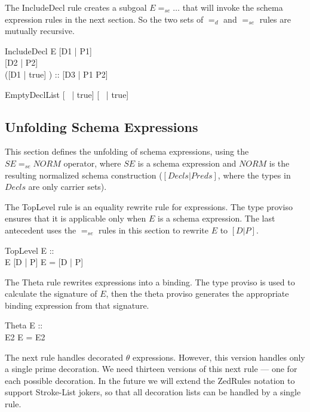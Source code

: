 \documentclass{entcs}
\newcommand{\sexprUnfoldsTo}{\mathrel{=_{se}}}
\newcommand{\declListUnfoldsTo}{\mathrel{=_d}}
\newcommand{\is}{\mathrel{is}}
\begin{document}
The IncludeDecl rule creates a subgoal $E \sexprUnfoldsTo \ldots$ that
will invoke the schema expression rules in the next section.  So the
two sets of $\declListUnfoldsTo$ and $\sexprUnfoldsTo$ rules are
mutually recursive.

\begin{zedrule}{IncludeDecl}
   E \sexprUnfoldsTo [D1 | P1] \\
   [D | true] \declListUnfoldsTo [D2 | P2] \\
   \proviso ([D1 | true] \land [D2 | true]) :: \power [D3 | true] 
\derives
   [E; D | true] \declListUnfoldsTo [D3 |  P1 \land P2]
\end{zedrule}

\begin{zedrule}{EmptyDeclList}
   [~ | true] \declListUnfoldsTo [~ | true]
\end{zedrule}


\subsection{Unfolding Schema Expressions}

This section defines the unfolding of schema expressions,
using the $SE \sexprUnfoldsTo NORM$ operator, where $SE$
is a schema expression and $NORM$ is the resulting normalized
schema construction ($[Decls|Preds]$, where the types in $Decls$
are only carrier sets).

The TopLevel rule is an equality rewrite rule for expressions.  The
type proviso ensures that it is applicable only when $E$ is a schema
expression.  The last antecedent uses the $\sexprUnfoldsTo$ rules in
this section to rewrite $E$ to $[D | P]$.

\begin{zedrule}{TopLevel}
  \proviso E :: \power [D2 | true] \\
  E  \sexprUnfoldsTo [D | P]
\derives
  E = [D | P]
\end{zedrule}

The Theta rule rewrites expressions into a binding.  The type
proviso is used to calculate the signature of $E$, then the theta
proviso generates the appropriate binding expression from that
signature.
\begin{zedrule}{Theta}
  \proviso E :: \power [D | true] \\
  \proviso \theta [D | true] \is E2
\derives
  \theta E = E2
\end{zedrule}


The next rule handles decorated $\theta$ expressions.  However, this
version handles only a single prime decoration.  We need thirteen
versions of this next rule --- one for each possible decoration.  In
the future we will extend the ZedRules notation to support Stroke-List
jokers, so that all decoration lists can be handled by a single rule.
\end{document}
